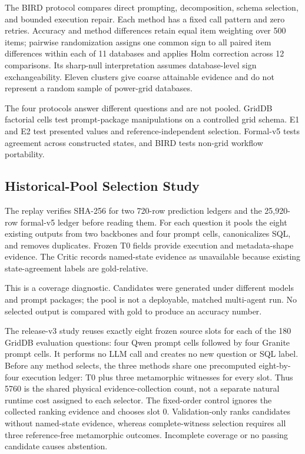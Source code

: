\documentclass[applsci,article,submit,moreauthors]{Definitions/mdpi}
\begin{document}
The BIRD protocol compares direct prompting, decomposition, schema selection, and bounded execution repair. Each method has a fixed call pattern and zero retries. Accuracy and method differences retain equal item weighting over 500 items; pairwise randomization assigns one common sign to all paired item differences within each of 11 databases and applies Holm correction across 12 comparisons. Its sharp-null interpretation assumes database-level sign exchangeability. Eleven clusters give coarse attainable evidence and do not represent a random sample of power-grid databases.

The four protocols answer different questions and are not pooled. GridDB factorial cells test prompt-package manipulations on a controlled grid schema. E1 and E2 test presented values and reference-independent selection. Formal-v5 tests agreement across constructed states, and BIRD tests non-grid workflow portability.

\subsection{Historical-Pool Selection Study}

The replay verifies SHA-256 for two 720-row prediction ledgers and the 25,920-row formal-v5 ledger before reading them. For each question it pools the eight existing outputs from two backbones and four prompt cells, canonicalizes SQL, and removes duplicates. Frozen T0 fields provide execution and metadata-shape evidence. The Critic records named-state evidence as unavailable because existing state-agreement labels are gold-relative.

This is a coverage diagnostic. Candidates were generated under different models and prompt packages; the pool is not a deployable, matched multi-agent run. No selected output is compared with gold to produce an accuracy number.

The release-v3 study reuses exactly eight frozen source slots for each of the 180 GridDB evaluation questions: four Qwen prompt cells followed by four Granite prompt cells. It performs no LLM call and creates no new question or SQL label. Before any method selects, the three methods share one precomputed eight-by-four execution ledger: T0 plus three metamorphic witnesses for every slot. Thus 5760 is the shared physical evidence-collection count, not a separate natural runtime cost assigned to each selector. The fixed-order control ignores the collected ranking evidence and chooses slot 0. Validation-only ranks candidates without named-state evidence, whereas complete-witness selection requires all three reference-free metamorphic outcomes. Incomplete coverage or no passing candidate causes abstention.
\end{document}
